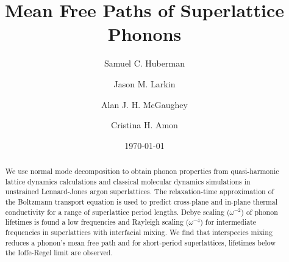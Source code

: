 \documentclass[aps,prb,preprint,preprintnumbers,amsmath,amssymb,floatfix,superscriptaddress]{revtex4}
\begin{document}
\title{Mean Free Paths of Superlattice Phonons}
\author{Samuel C. Huberman}
\author{Jason M. Larkin}
\author{Alan J. H. McGaughey}
\author{Cristina H. Amon}

\date{\today}%
\vspace{14mm}
  
\begin{abstract}

We use normal mode decomposition to obtain phonon properties from quasi-harmonic lattice dynamics calculations and classical molecular dynamics simulations in unstrained Lennard-Jones argon superlattices. The relaxation-time approximation of the Boltzmann transport equation is used to predict cross-plane and in-plane thermal conductivity for a range of superlattice period lengths. Debye scaling ($\omega^{-2}$) of phonon lifetimes is found a low frequencies and Rayleigh scaling ($\omega^{-4}$) for intermediate frequencies in superlattices with interfacial mixing. We find that interspecies mixing reduces a phonon's mean free path and for short-period superlattices, lifetimes below the Ioffe-Regel limit are observed.

\end{abstract}
\maketitle
\end{document}
